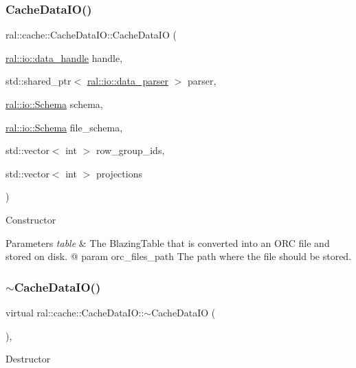 \subsubsection{\texorpdfstring{Cache\+Data\+I\+O()}{CacheDataIO()}}
{\footnotesize\ttfamily ral\+::cache\+::\+Cache\+Data\+I\+O\+::\+Cache\+Data\+IO (\begin{DoxyParamCaption}\item[{\hyperlink{structral_1_1io_1_1data__handle}{ral\+::io\+::data\+\_\+handle}}]{handle,  }\item[{std\+::shared\+\_\+ptr$<$ \hyperlink{classral_1_1io_1_1data__parser}{ral\+::io\+::data\+\_\+parser} $>$}]{parser,  }\item[{\hyperlink{classral_1_1io_1_1Schema}{ral\+::io\+::\+Schema}}]{schema,  }\item[{\hyperlink{classral_1_1io_1_1Schema}{ral\+::io\+::\+Schema}}]{file\+\_\+schema,  }\item[{std\+::vector$<$ int $>$}]{row\+\_\+group\+\_\+ids,  }\item[{std\+::vector$<$ int $>$}]{projections }\end{DoxyParamCaption})}

Constructor 
\begin{DoxyParams}{Parameters}
{\em table} & The Blazing\+Table that is converted into an O\+RC file and stored on disk. @ param orc\+\_\+files\+\_\+path The path where the file should be stored. \\
\hline
\end{DoxyParams}
\mbox{\label{classral_1_1cache_1_1CacheDataIO_a335ec293cd6e3d928396ae99e3785906}} 
\subsubsection{\texorpdfstring{$\sim$\+Cache\+Data\+I\+O()}{~CacheDataIO()}}
{\footnotesize\ttfamily virtual ral\+::cache\+::\+Cache\+Data\+I\+O\+::$\sim$\+Cache\+Data\+IO (\begin{DoxyParamCaption}{ }\end{DoxyParamCaption})\hspace{0.3cm}{\ttfamily [inline]}, {\ttfamily [virtual]}}

Destructor 


